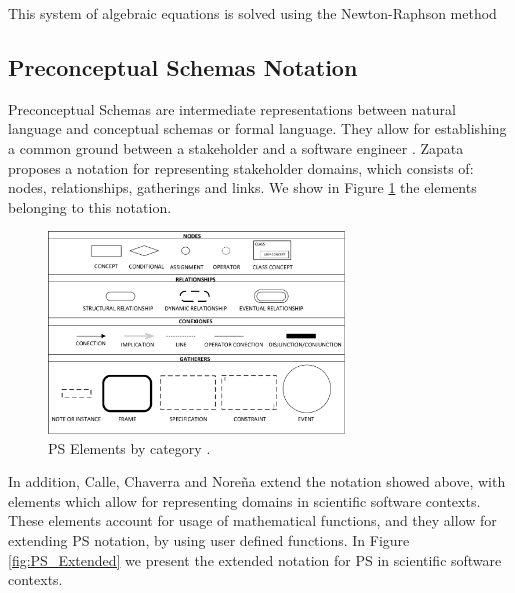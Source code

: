 \documentclass[review]{elsarticle}
\begin{document}
This system of algebraic equations is solved using the Newton-Raphson method \cite{atkinson2008introduction}

\subsection{Preconceptual Schemas Notation}
Preconceptual Schemas are intermediate representations between natural language and conceptual schemas or formal language. They allow for establishing a common ground between a stakeholder and a software engineer \cite{zapata2007phd}. Zapata \cite{zapata2012unc} proposes a notation for representing stakeholder domains, which consists of: nodes, relationships, gatherings and links. We show in Figure \ref{fig:PS_Elements} the elements belonging to this notation.\\

\begin{figure}
	\centering
	\includegraphics[width=0.7\textwidth]{Figures/PSElements.pdf}
	\caption{PS Elements by category \cite{zapata2012unc}.}
	\label{fig:PS_Elements}
\end{figure}

In addition, Calle, Chaverra and Nore\~na \cite{JCalle,norena2018Ling, JChaverra} extend the notation showed above, with elements which allow for representing domains in scientific software contexts. These elements account for usage of mathematical functions, and they allow for extending PS notation, by using user defined functions. In Figure \ref{fig:PS_Extended} we present the extended notation for PS in scientific software contexts.
\end{document}
